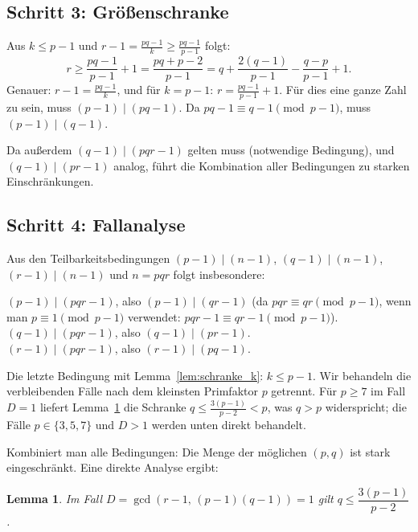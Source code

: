 \documentclass[12pt,a4paper]{amsart}
\newtheorem{lemma}[theorem]{Lemma}
\theoremstyle{definition}
\begin{document}
\subsection{Schritt 3: Größenschranke}

Aus $k \le p - 1$ und $r - 1 = \tfrac{pq-1}{k} \ge \tfrac{pq-1}{p-1}$ folgt:
\[
  r \ge \frac{pq - 1}{p - 1} + 1 = \frac{pq + p - 2}{p-1} = q + \frac{2(q-1)}{p-1} - \frac{q-p}{p-1} + 1.
\]
Genauer: $r - 1 = \tfrac{pq-1}{k}$, und für $k = p - 1$:
$r = \tfrac{pq-1}{p-1} + 1$. Für dies eine ganze Zahl zu sein, muss
$(p-1) \mid (pq - 1)$. Da $pq - 1 \equiv q - 1 \pmod{p-1}$, muss $(p-1) \mid (q-1)$.

\medskip
Da außerdem $(q-1) \mid (pqr - 1)$ gelten muss (notwendige Bedingung), und
$(q-1) \mid (pr - 1)$ analog, führt die Kombination aller Bedingungen zu
starken Einschränkungen.

\subsection{Schritt 4: Fallanalyse}

Aus den Teilbarkeitsbedingungen $(p-1) \mid (n-1)$, $(q-1) \mid (n-1)$, $(r-1) \mid (n-1)$
und $n = pqr$ folgt insbesondere:

\noindent$(p-1) \mid (pqr - 1)$, also $(p-1) \mid (qr - 1)$
(da $pqr \equiv qr \pmod{p-1}$, wenn man $p \equiv 1 \pmod{p-1}$ verwendet:
$pqr - 1 \equiv qr - 1 \pmod{p-1}$). \\
$(q-1) \mid (pqr - 1)$, also $(q-1) \mid (pr - 1)$. \\
$(r-1) \mid (pqr - 1)$, also $(r-1) \mid (pq - 1)$.

\medskip
\noindent Die letzte Bedingung mit Lemma~\ref{lem:schranke_k}: $k \le p - 1$.
Wir behandeln die verbleibenden Fälle nach dem kleinsten Primfaktor $p$ getrennt.
Für $p \ge 7$ im Fall $D = 1$ liefert Lemma~\ref{lem:grenze_q} die Schranke
$q \le \tfrac{3(p-1)}{p-2} < p$, was $q > p$ widerspricht;
die Fälle $p \in \{3, 5, 7\}$ und $D > 1$ werden unten direkt behandelt.

\medskip
Kombiniert man alle Bedingungen: Die Menge der möglichen $(p, q)$ ist stark
eingeschränkt. Eine direkte Analyse ergibt:

\begin{lemma}
\label{lem:grenze_q}
Im Fall $D = \gcd(r-1,\, (p-1)(q-1)) = 1$ gilt $q \le \dfrac{3(p-1)}{p-2}$.
\end{lemma}
\end{document}
